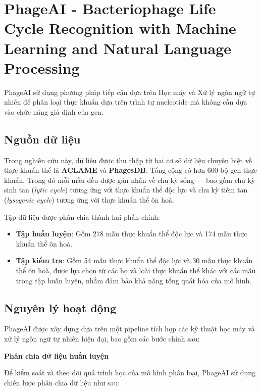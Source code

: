 \section{PhageAI - Bacteriophage Life Cycle Recognition with Machine Learning and Natural Language Processing \cite{PhageAI_Tynecki2020.07.11.198606}}

PhageAI sử dụng phương pháp tiếp cận dựa trên Học máy và Xử lý ngôn ngữ tự nhiên để phân loại thực khuẩn dựa trên trình tự nucleotide mà không cần dựa vào chức năng giả định của gen.

\subsection{Nguồn dữ liệu}

Trong nghiên cứu này, dữ liệu được thu thập từ hai cơ sở dữ liệu chuyên biệt về thực khuẩn thể là \textbf{ACLAME} và \textbf{PhagesDB}. Tổng cộng có hơn 600 bộ gen thực khuẩn. Trong đó mỗi mẫu đều được gán nhãn về chu kỳ sống — bao gồm chu kỳ sinh tan (\textit{lytic cycle}) tương ứng với thực khuẩn thể độc lực và chu kỳ tiềm tan (\textit{lysogenic cycle}) tương ứng với thực khuẩn thể ôn hoà.

Tập dữ liệu được phân chia thành hai phần chính:

\begin{itemize}
\item \textbf{Tập huấn luyện}: Gồm 278 mẫu thực khuẩn thể độc lực và 174 mẫu thực khuẩn thể ôn hoà.
\item \textbf{Tập kiểm tra}: Gồm 54 mẫu thực khuẩn thể độc lực và 30 mẫu thực khuẩn thể ôn hoà, được lựa chọn từ các họ và loài thực khuẩn thể khác với các mẫu trong tập huấn luyện, nhằm đảm bảo khả năng tổng quát hóa của mô hình.
\end{itemize}

\subsection{Nguyên lý hoạt động}

PhageAI được xây dựng dựa trên một pipeline tích hợp các kỹ thuật học máy và xử lý ngôn ngữ tự nhiên hiện đại, bao gồm các bước chính sau:

\textbf{Phân chia dữ liệu huấn luyện}

Để kiểm soát và theo dõi quá trình học của mô hình phân loại, PhageAI sử dụng chiến lược phân chia dữ liệu như sau:

